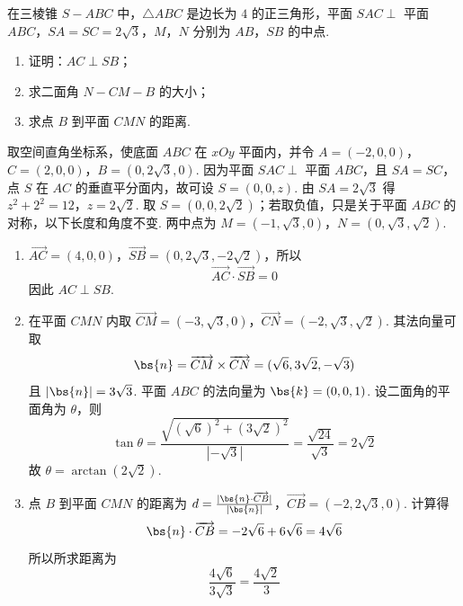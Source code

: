 \begin{problem}
在三棱锥 \(S-ABC\) 中，\(\triangle ABC\) 是边长为 \(4\) 的正三角形，平面 \(SAC\perp\) 平面 \(ABC\)，\(SA=SC=2\sqrt{3}\)，\(M\)，\(N\) 分别为 \(AB\)，\(SB\) 的中点.

\begin{enumerate}
\item 证明：\(AC\perp SB\)；
\item 求二面角 \(N-CM-B\) 的大小；
\item 求点 \(B\) 到平面 \(CMN\) 的距离.
\end{enumerate}

\end{problem}

\begin{solution}
取空间直角坐标系，使底面 \(ABC\) 在 \(xOy\) 平面内，并令
\(A=(-2,0,0)\)，\(C=(2,0,0)\)，\(B=(0,2\sqrt3,0)\).
因为平面 \(SAC\perp\) 平面 \(ABC\)，且 \(SA=SC\)，点 \(S\) 在 \(AC\) 的垂直平分面内，故可设 \(S=(0,0,z)\).  由 \(SA=2\sqrt3\) 得
\(z^2+2^2=12\)，\(z=2\sqrt2\).
取 \(S=(0,0,2\sqrt2)\)；若取负值，只是关于平面 \(ABC\) 的对称，以下长度和角度不变.  两中点为
\(M=(-1,\sqrt3,0)\)，\(N=(0,\sqrt3,\sqrt2)\).

\begin{enumerate}
\item \(\overrightarrow{AC}=(4,0,0)\)，\(\overrightarrow{SB}=(0,2\sqrt3,-2\sqrt2)\)，所以
\[
\overrightarrow{AC}\cdot\overrightarrow{SB}=0
\]
因此 \(AC\perp SB\).

\item 在平面 \(CMN\) 内取
\(\overrightarrow{CM}=(-3,\sqrt3,0)\)，\(\overrightarrow{CN}=(-2,\sqrt3,\sqrt2)\).
其法向量可取
\[
\bs{n}=\overrightarrow{CM}\times\overrightarrow{CN}=(\sqrt6,3\sqrt2,-\sqrt3)
\]
且 \(|\bs{n}|=3\sqrt3\).  平面 \(ABC\) 的法向量为 \(\bs{k}=(0,0,1)\).  设二面角的平面角为 \(\theta\)，则
\[
\tan\theta=\frac{\sqrt{(\sqrt6)^2+(3\sqrt2)^2}}{|{-\sqrt3}|}=\frac{\sqrt{24}}{\sqrt3}=2\sqrt2
\]
故 \(\theta=\arctan(2\sqrt2)\).

\item 点 \(B\) 到平面 \(CMN\) 的距离为
\(d=\frac{|\bs{n}\cdot\overrightarrow{CB}|}{|\bs{n}|}\)，\(\overrightarrow{CB}=(-2,2\sqrt3,0)\).
计算得
\[
\bs{n}\cdot\overrightarrow{CB}=-2\sqrt6+6\sqrt6=4\sqrt6
\]
所以所求距离为
\[
\frac{4\sqrt6}{3\sqrt3}=\frac{4\sqrt2}{3}
\]
\end{enumerate}
\end{solution}

